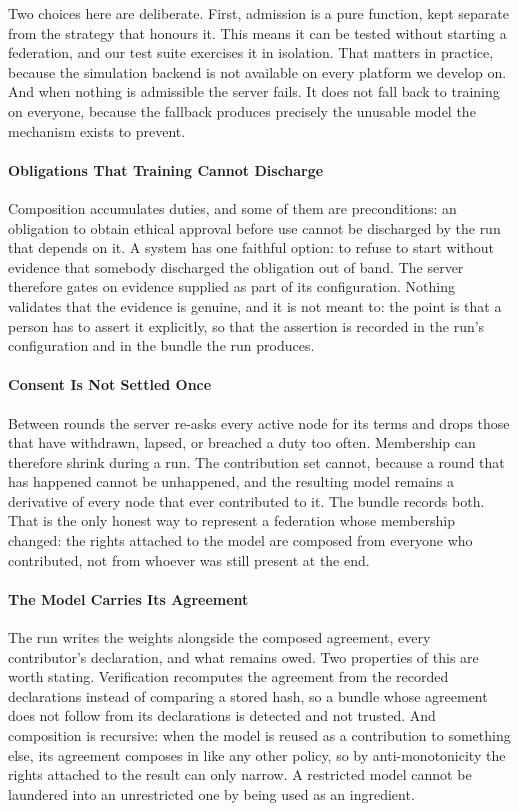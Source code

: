 \documentclass[10pt,conference]{IEEEtran}
\begin{document}
Two choices here are deliberate. First, admission is a pure function, kept separate from the strategy that honours it. This means it can be tested without starting a federation, and our test suite exercises it in isolation. That matters in practice, because the simulation backend is not available on every platform we develop on. And when
nothing is admissible the server fails. It does not fall back to training on everyone, because the fallback produces precisely the unusable model the
mechanism exists to prevent.

\paragraph{Obligations That Training Cannot Discharge}

Composition accumulates duties, and some of them are preconditions: an
obligation to obtain ethical approval before use cannot be discharged by the
run that depends on it. A system has one faithful option: to refuse to start without evidence that somebody discharged the obligation out of band. The
server therefore gates on evidence supplied as part of its configuration.
Nothing validates that the evidence is genuine, and it is not meant to: the
point is that a person has to assert it explicitly, so that the assertion is
recorded in the run's configuration and in the bundle the run produces.

\paragraph{Consent Is Not Settled Once}

Between rounds the server re-asks every active node for its terms and drops
those that have withdrawn, lapsed, or breached a duty too often. Membership can
therefore shrink during a run. The contribution set cannot, because a round that
has happened cannot be unhappened, and the resulting model remains a derivative
of every node that ever contributed to it. The bundle records both. That is the only honest way to represent a federation whose membership changed: the rights
attached to the model are composed from everyone who contributed, not from
whoever was still present at the end.

\paragraph{The Model Carries Its Agreement}

The run writes the weights alongside the composed agreement, every
contributor's declaration, and what remains owed. Two properties of this are
worth stating. Verification recomputes the agreement from the recorded declarations instead of comparing a stored hash, so a bundle whose agreement
does not follow from its declarations is detected and not trusted. And
composition is recursive: when the model is reused as a contribution to
something else, its agreement composes in like any other policy, so by
anti-monotonicity the rights attached to the result can only narrow. A
restricted model cannot be laundered into an unrestricted one by being used as
an ingredient.
\end{document}

